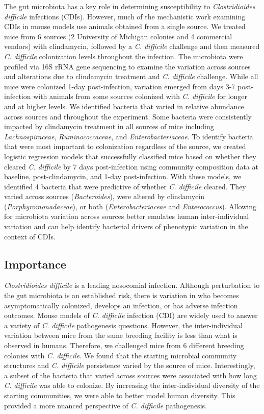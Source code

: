 \documentclass[
  11pt,
]{article}
\begin{document}
The gut microbiota has a key role in determining susceptibility to
\emph{Clostridioides difficile} infections (CDIs). However, much of the
mechanistic work examining CDIs in mouse models use animals obtained
from a single source. We treated mice from 6 sources (2 University of
Michigan colonies and 4 commercial vendors) with clindamycin, followed
by a \emph{C. difficile} challenge and then measured \emph{C. difficile}
colonization levels throughout the infection. The microbiota were
profiled via 16S rRNA gene sequencing to examine the variation across
sources and alterations due to clindamycin treatment and \emph{C.
difficile} challenge. While all mice were colonized 1-day
post-infection, variation emerged from days 3-7 post-infection with
animals from some sources colonized with \emph{C. difficile} for longer
and at higher levels. We identified bacteria that varied in relative
abundance across sources and throughout the experiment. Some bacteria
were consistently impacted by clindamycin treatment in all sources of
mice including \emph{Lachnospiraceae}, \emph{Ruminococcaceae}, and
\emph{Enterobacteriaceae}. To identify bacteria that were most important
to colonization regardless of the source, we created logistic regression
models that successfully classified mice based on whether they cleared
\emph{C. difficile} by 7 days post-infection using community composition
data at baseline, post-clindamycin, and 1-day post-infection. With these
models, we identified 4 bacteria that were predictive of whether
\emph{C. difficile} cleared. They varied across sources
(\emph{Bacteroides}), were altered by clindamycin
(\emph{Porphyromonadaceae}), or both (\emph{Enterobacteriaceae} and
\emph{Enterococcus}). Allowing for microbiota variation across sources
better emulates human inter-individual variation and can help identify
bacterial drivers of phenotypic variation in the context of CDIs.

\hypertarget{importance}{%
\subsection{Importance}\label{importance}}

\emph{Clostridioides difficile} is a leading nosocomial infection.
Although perturbation to the gut microbiota is an established risk,
there is variation in who becomes asymptomatically colonized, develops
an infection, or has adverse infection outcomes. Mouse models of
\emph{C. difficile} infection (CDI) are widely used to answer a variety
of \emph{C. difficile} pathogenesis questions. However, the
inter-individual variation between mice from the same breeding facility
is less than what is observed in humans. Therefore, we challenged mice
from 6 different breeding colonies with \emph{C. difficile}. We found
that the starting microbial community structures and \emph{C. difficile}
persistence varied by the source of mice. Interestingly, a subset of the
bacteria that varied across sources were associated with how long
\emph{C. difficile} was able to colonize. By increasing the
inter-individual diversity of the starting communities, we were able to
better model human diversity. This provided a more nuanced perspective
of \emph{C. difficile} pathogenesis.
\end{document}
